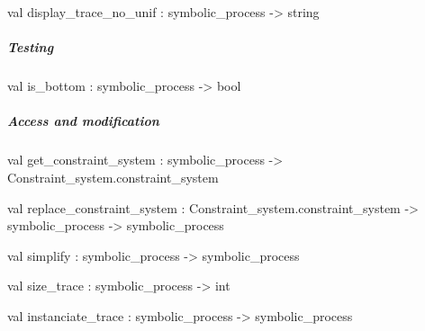 \label{val:Process.display-underscoretrace-underscoreno-underscoreunif}\begin{ocamldoccode}
val display_trace_no_unif : symbolic_process -> string
\end{ocamldoccode}




\subparagraph{Testing}




\label{val:Process.is-underscorebottom}\begin{ocamldoccode}
val is_bottom : symbolic_process -> bool
\end{ocamldoccode}




\subparagraph{Access and modification}




\label{val:Process.get-underscoreconstraint-underscoresystem}\begin{ocamldoccode}
val get_constraint_system :
  symbolic_process -> Constraint_system.constraint_system
\end{ocamldoccode}




\label{val:Process.replace-underscoreconstraint-underscoresystem}\begin{ocamldoccode}
val replace_constraint_system :
  Constraint_system.constraint_system ->
  symbolic_process -> symbolic_process
\end{ocamldoccode}




\label{val:Process.simplify}\begin{ocamldoccode}
val simplify : symbolic_process -> symbolic_process
\end{ocamldoccode}




\label{val:Process.size-underscoretrace}\begin{ocamldoccode}
val size_trace : symbolic_process -> int
\end{ocamldoccode}




\label{val:Process.instanciate-underscoretrace}\begin{ocamldoccode}
val instanciate_trace : symbolic_process -> symbolic_process
\end{ocamldoccode}




